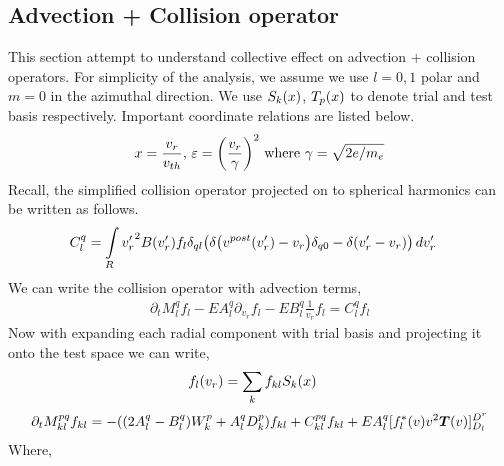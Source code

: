 \documentclass{article}[draft]
\begin{document}
\clearpage
\subsection{Advection + Collision operator}
This section attempt to understand collective effect on advection + collision operators. For simplicity of the analysis, we assume we use $l=0,1$ polar and $m=0$ in the azimuthal direction. We use $S_k\of{x}$, $T_p\of{x}$ to denote trial and test basis respectively. Important coordinate relations are listed below. 
\begin{align*}
x =\frac{v_r}{v_{th}} \text{, } \varepsilon = \of{\frac{v_r}{\gamma}}^2 \text{ where } \gamma = \sqrt{2 e / m_e}
\end{align*}
Recall, the simplified collision operator projected on to spherical harmonics can be written as follows. 
\begin{align*}
C^{q}_{l} &= \myint_{R} {v^\prime_r}^2 B(v^\prime_r) f_l \delta_{ql}\of{\delta\of{v^{post}(v^\prime_r)-v_r} \delta_{q0} - \delta\of{v^\prime_r -v_r}} \diff{v^\prime_r}
\end{align*} We can write the collision operator with advection terms, 
\begin{align*}
\partial_t M^{q}_{l} f_{l}
-E A^{q}_{l} \partial_{v_r} f_{l}  
-E B^{q}_{l} \frac{1}{v_r}f_{l}  = 
C^{q}_{l}f_{l}
\end{align*} Now with expanding each radial component with trial basis and projecting it onto the test space we can write, 
\begin{align*}
f_l\of{v_r} &= \sum_{k} f_{kl} S_k(x) 
\end{align*}
\begin{align*}
\partial_t M^{pq}_{kl} f_{kl} = -\of{\of{2 A^{q}_{l} -B^{q}_{l}} W^p_{k} + A^{q}_{l} D^{p}_{k}}f_{kl} + C^{pq}_{kl} f_{kl} + EA^{q}_{l}[f_{l}^*(v) v^2 \boldsymbol{T}\of{v}]_{D_l}^{D^r}
\end{align*}Where, 
\end{document}
